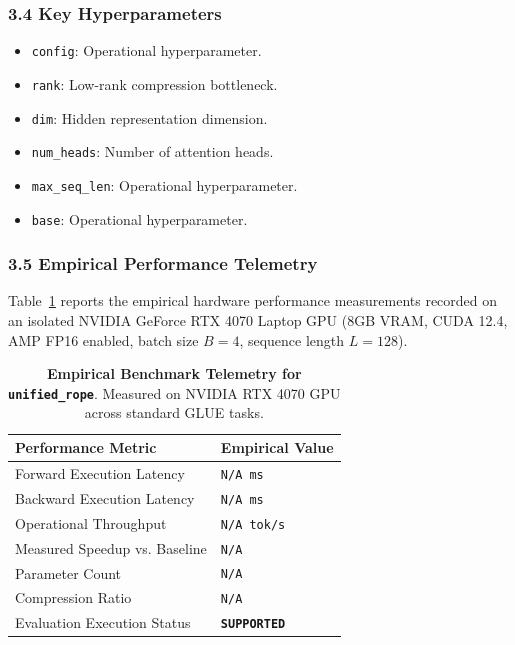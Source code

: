 \subsubsection*{3.4 Key Hyperparameters}
\begin{itemize}
    \item \texttt{config}: Operational hyperparameter.
    \item \texttt{rank}: Low-rank compression bottleneck.
    \item \texttt{dim}: Hidden representation dimension.
    \item \texttt{num\_heads}: Number of attention heads.
    \item \texttt{max\_seq\_len}: Operational hyperparameter.
    \item \texttt{base}: Operational hyperparameter.
\end{itemize}

\subsubsection*{3.5 Empirical Performance Telemetry}
Table~\ref{tab:telemetry_unified\_rope} reports the empirical hardware performance measurements recorded on an isolated NVIDIA GeForce RTX 4070 Laptop GPU (8GB VRAM, CUDA 12.4, AMP FP16 enabled, batch size $B=4$, sequence length $L=128$).

\begin{table}[h]
\centering
\small
\caption{\textbf{Empirical Benchmark Telemetry for \texttt{unified\_rope}}. Measured on NVIDIA RTX 4070 GPU across standard GLUE tasks.}
\label{tab:telemetry_unified\_rope}
\begin{tabularx}{\columnwidth}{lX}
\toprule
\textbf{Performance Metric} & \textbf{Empirical Value} \\
\midrule
Forward Execution Latency & \texttt{N/A ms} \\
Backward Execution Latency & \texttt{N/A ms} \\
Operational Throughput & \texttt{N/A tok/s} \\
Measured Speedup vs. Baseline & \texttt{N/A} \\
Parameter Count & \texttt{N/A} \\
Compression Ratio & \texttt{N/A} \\
Evaluation Execution Status & \textbf{\texttt{SUPPORTED}} \\
\bottomrule
\end{tabularx}
\end{table}

